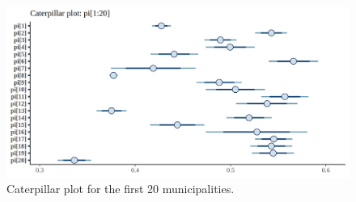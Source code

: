 \documentclass[12pt]{article}
\begin{document}
\begin{figure}
    \centering
    \includegraphics[width=0.75\linewidth]{pictures/cater1-20.png}
    \caption{Caterpillar plot for the first 20 municipalities.}
    \label{fig:caterpillar1-20}
\end{figure}
\FloatBarrier



    
\end{document}
